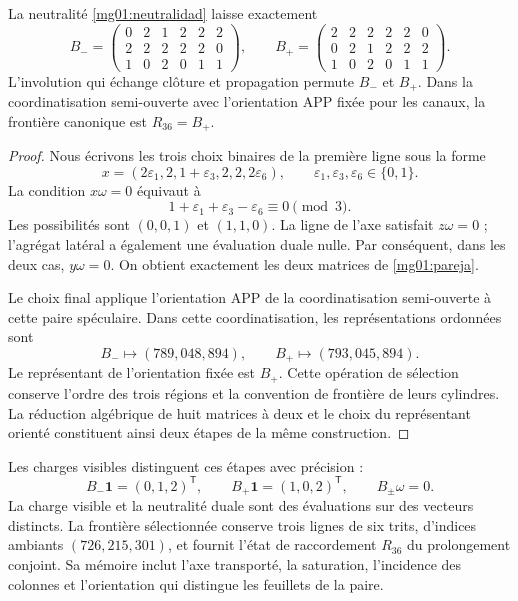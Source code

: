 \begin{proposition}
\label{mg01:dos-orientacion}
La neutralité \eqref{mg01:neutralidad} laisse exactement
\begin{equation}
 B_-=
 \begin{pmatrix}0&2&1&2&2&2\\2&2&2&2&2&0\\1&0&2&0&1&1\end{pmatrix},
 \qquad
 B_+=
 \begin{pmatrix}2&2&2&2&2&0\\0&2&1&2&2&2\\1&0&2&0&1&1\end{pmatrix}.
 \label{mg01:pareja}
\end{equation}
L'involution qui échange clôture et propagation permute \(B_-\)
et \(B_+\). Dans la coordinatisation semi-ouverte avec l'orientation APP fixée pour
les canaux, la frontière canonique est \(R_{36}=B_+\).
\end{proposition}
\begin{proof}
Nous écrivons les trois choix binaires de la première ligne sous la forme
\[
 x=(2\varepsilon_1,2,1+\varepsilon_3,2,2,2\varepsilon_6),
 \qquad \varepsilon_1,\varepsilon_3,\varepsilon_6\in\{0,1\}.
\]
La condition \(x\omega=0\) équivaut à
\[
 1+\varepsilon_1+\varepsilon_3-\varepsilon_6\equiv0\pmod3.
\]
Les possibilités sont \((0,0,1)\) et \((1,1,0)\). La ligne de l'axe
satisfait \(z\omega=0\) ; l'agrégat latéral a également une évaluation
duale nulle. Par conséquent, dans les deux cas, \(y\omega=0\). On obtient
exactement les deux matrices de \eqref{mg01:pareja}.

Le choix final applique l'orientation APP de la coordinatisation semi-ouverte à
cette paire spéculaire. Dans cette coordinatisation, les représentations ordonnées sont
\[
 B_-\longmapsto(789,048,894),\qquad
 B_+\longmapsto(793,045,894).
\]
Le représentant de l'orientation fixée est \(B_+\). Cette opération de sélection conserve l'ordre des trois régions et la convention de frontière de leurs cylindres. La réduction algébrique de huit matrices à deux et le choix du représentant orienté constituent ainsi deux étapes de la même construction.
\end{proof}

Les charges visibles distinguent ces étapes avec précision :
\begin{equation}
 B_-\mathbf1=(0,1,2)^{\mathsf T},\qquad
 B_+\mathbf1=(1,0,2)^{\mathsf T},\qquad
 B_\pm\omega=0.
 \label{mg01:cargas}
\end{equation}
La charge visible et la neutralité duale sont des évaluations sur des vecteurs
distincts. La frontière sélectionnée conserve trois lignes de six trits,
d'indices ambiants \((726,215,301)\), et fournit l'état
de raccordement \(R_{36}\) du prolongement conjoint. Sa mémoire inclut
l'axe transporté, la saturation, l'incidence des colonnes et
l'orientation qui distingue les feuillets de la paire.
